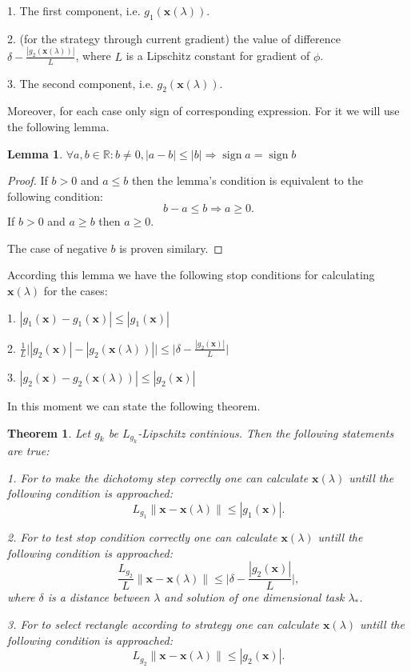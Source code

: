 \documentclass[12pt]{article}
\newtheorem{theorem}{Theorem}[section]
\newtheorem{lemma}{Lemma}[section]
\DeclareMathOperator{\sign}{sign}
\begin{document}
1. The first component, i.e. $g_1(\textbf{x}(\lambda))$.

2. (for the strategy through current gradient) the value of difference $\delta-\frac{|g_2(\textbf{x}(\lambda))|}{L}$, where $L$ is a Lipschitz constant for gradient of $\phi$.

3. The second component, i.e. $g_2(\textbf{x}(\lambda))$.

Moreover, for each case only sign of corresponding expression. For it we will use the following lemma.
\begin{lemma}
$\forall a,b\in\mathbb{R}:b\neq 0, |a-b|\leq |b| \Rightarrow \sign a = \sign b$
\end{lemma}
\begin{proof}
If $b>0$ and $a\leq b$ then the lemma's condition is equivalent to the following condition:
$$b-a\leq b\Rightarrow a\geq 0.$$
If $b>0$ and $a \geq b$ then $a\geq 0$.

The case of negative $b$ is proven similary.
\end{proof}

According this lemma we have the following stop conditions for calculating $\textbf{x}(\lambda)$ for the cases:

1. $|g_1(\textbf{x})-g_1(\textbf{x})|\leq |g_1(\textbf{x})|$

2. $\frac{1}{L}\Big||g_2(\textbf{x})|-|g_2(\textbf{x}(\lambda))|\Big|\leq \Big|\delta-\frac{|g_2(\textbf{x})|}{L}\Big|$

3. $|g_2(\textbf{x})-g_2(\textbf{x}(\lambda))|\leq |g_2(\textbf{x})|$

In this moment we can state the following theorem.

\begin{theorem}\label{x_lambda}
Let $g_k$ be $L_{g_k}$-Lipschitz continious. Then the following statements are true:

1. For to make the dichotomy step correctly one can calculate $\textbf{x}(\lambda)$ untill the following condition is approached:
$$L_{g_1}\|\textbf{x}-\textbf{x}(\lambda)\|\leq |g_1(\textbf{x})|.$$

2. For to test stop condition correctly one can calculate $\textbf{x}(\lambda)$ untill the following condition is approached:
$$\frac{L_{g_2}}{L}\|\textbf{x}-\textbf{x}(\lambda)\|\leq\Big|\delta-\frac{|g_2(\textbf{x})|}{L}\Big|,$$
where $\delta$ is a distance between $\lambda$ and solution of one dimensional task $\lambda_*$.

3. For to select rectangle according to strategy one can calculate $\textbf{x}(\lambda)$ untill the following condition is approached:
$$L_{g_2}\|\textbf{x}-\textbf{x}(\lambda)\|\leq |g_2(\textbf{x})|.$$
\end{theorem}
\end{document}

